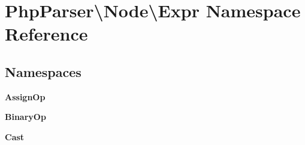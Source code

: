 \section{Php\+Parser\textbackslash{}Node\textbackslash{}Expr Namespace Reference}
\label{namespace_php_parser_1_1_node_1_1_expr}
\subsection*{Namespaces}
\begin{DoxyCompactItemize}
\item 
 {\bf Assign\+Op}
\item 
 {\bf Binary\+Op}
\item 
 {\bf Cast}
\end{DoxyCompactItemize}
